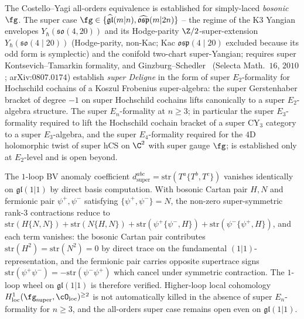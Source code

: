 \begin{remark}
\label{rem:5d-super-hcs-open}
The Costello--Yagi all-orders equivalence is established for
simply-laced \emph{bosonic} $\fg$. The super case
$\fg \in \{\widehat{\mathfrak{gl}}(m|n), \widehat{\mathfrak{osp}}(m|2n)\}$
-- the regime of the K$3$ Yangian envelopes $Y_\hbar(\mathfrak{so}(4, 20))$ and its Hodge-parity $\Z/2$-super-extension $Y_\hbar(\mathfrak{so}(4 \mid 20))$ (Hodge-parity, non-Kac; Kac $\mathfrak{osp}(4 \mid 20)$ excluded because its odd form is symplectic) and
the conifold two-chart super-Yangian; requires super
Kontsevich--Tamarkin formality, and
Ginzburg--Schedler~\cite{GinzburgSchedler2008} (Selecta Math.~$16$,
$2010$; arXiv:$0807.0174$) establish \emph{super Deligne} in the form
of super $E_2$-formality for Hochschild cochains of a Koszul Frobenius
super-algebra: the super Gerstenhaber bracket of degree $-1$ on super
Hochschild cochains lifts canonically to a super $E_2$-algebra
structure. The super $E_n$-formality at $n \ge 3$; in particular
the super $E_3$-formality required to lift the Hochschild cochain
bracket of a super CY$_3$ category to a super $E_3$-algebra, and the
super $E_4$-formality required for the $4$D holomorphic twist of super
hCS on $\C^2$ with super gauge $\fg$; is established only at
$E_2$-level and is open beyond.

The $1$-loop BV anomaly coefficient
$d^{abc}_{\mathrm{super}} = \mathrm{str}(T^a \{T^b, T^c\})$ vanishes
identically on $\mathfrak{gl}(1|1)$ by direct basis computation. With
bosonic Cartan pair $H, N$ and fermionic pair $\psi^+, \psi^-$
satisfying $\{\psi^+, \psi^-\} = N$, the non-zero super-symmetric
rank-$3$ contractions reduce to $\mathrm{str}(H \{N, N\}) +
\mathrm{str}(N \{H, N\}) + \mathrm{str}(\psi^+ \{\psi^-, H\}) +
\mathrm{str}(\psi^- \{\psi^+, H\})$, and each term vanishes: the
bosonic Cartan pair contributes $\mathrm{str}(H^2) = \mathrm{str}(N^2)
= 0$ by direct trace on the fundamental $(1|1)$-representation, and
the fermionic pair carries opposite supertrace signs $\mathrm{str}(\psi^+
\psi^-) = -\mathrm{str}(\psi^- \psi^+)$ which cancel under symmetric
contraction. The $1$-loop wheel on $\mathfrak{gl}(1|1)$ is therefore
verified. Higher-loop local cohomology
$H^1_{\mathrm{loc}}(\fg_{\mathrm{super}}, \cO_{\mathrm{loc}})^{\ge 2}$
is not automatically killed in the absence of super $E_n$-formality
for $n \ge 3$, and the all-orders super case remains open even on
$\mathfrak{gl}(1|1)$.
\end{remark}

